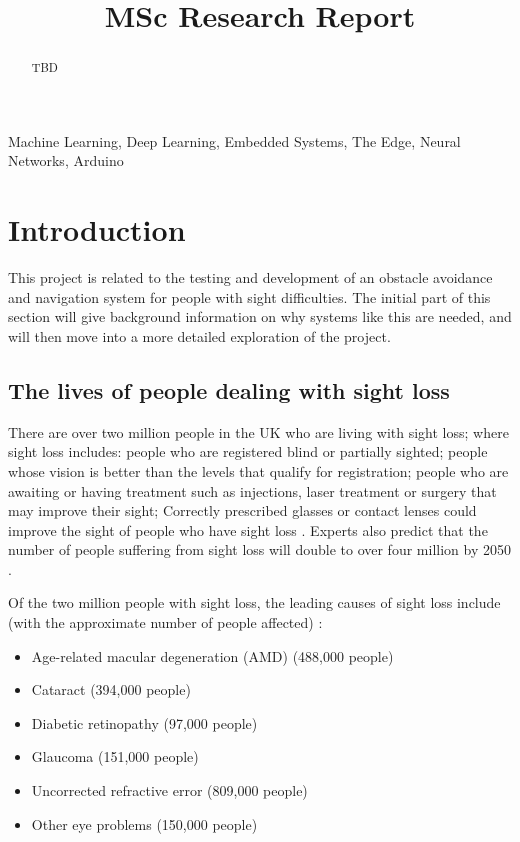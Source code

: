 \documentclass[conference]{IEEEtran}
\begin{document}
\title{MSc Research Report\\}

\author{
}

\maketitle

\begin{abstract}
TBD
\end{abstract}

\begin{IEEEkeywords}
Machine Learning, Deep Learning, Embedded Systems, The Edge, Neural Networks, Arduino
\end{IEEEkeywords}

\section{Introduction}
This project is related to the testing and development of an obstacle avoidance and navigation system for people with sight difficulties. The initial part of this section will give background information on why systems like this are needed, and will then move into a more detailed exploration of the project.
\subsection{The lives of people dealing with sight loss}
There are over two million people in the UK who are living with sight loss; where sight loss includes: people who are registered blind or partially sighted; people whose vision is better than the levels that qualify for registration; people who are awaiting or having treatment such as injections, laser treatment or surgery that may improve their sight; Correctly prescribed glasses or contact lenses could improve the sight of people who have sight loss \cite{rnib}. Experts also predict that the number of people suffering from sight loss will double to over four million by 2050 \cite{Pezzullo}.

Of the two million people with sight loss, the leading causes of sight loss include (with the approximate number of people affected) \cite{rnib}:
\begin{itemize}
    \item Age-related macular degeneration (AMD) (488,000 people)
    \item Cataract (394,000 people)
    \item Diabetic retinopathy (97,000 people)
    \item Glaucoma (151,000 people)
    \item Uncorrected refractive error (809,000 people)
    \item Other eye problems (150,000 people)
\end{itemize}
\end{document}
